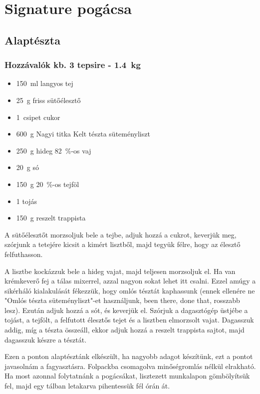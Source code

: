 \newpage
\section{Signature pogácsa} \label{sec:signature-pogacsa}

\subsection*{Alaptészta}
\subsubsection*{Hozzávalók kb. 3 tepsire - \qty{1.4}{\kg}}
\begin{itemize}
    \item \qty{150}{\ml} langyos tej
    \item \qty{25}{\g} friss sütőélesztő
    \item \qty{1}{csipet} cukor
    \item \qty{600}{\g} Nagyi titka Kelt tészta süteményliszt
    \item \qty{250}{\g} hideg \qty{82}{\percent}-os vaj
    \item \qty{20}{\g} só
    \item \qty{150}{g} \qty{20}{\percent}-os tejföl
    \item \num{1} tojás
    \item \qty{150}{\g} reszelt trappista
\end{itemize}

A sütőélesztőt morzsoljuk bele a tejbe, adjuk hozzá a cukrot, keverjük meg, szórjunk a tetejére kicsit a kimért lisztből, majd tegyük félre, hogy az élesztő felfuthasson.

A lisztbe kockázzuk bele a hideg vajat, majd teljesen morzsoljuk el. Ha van krémkeverő fej a tálas mixerrel, azzal nagyon sokat lehet itt csalni. Ezzel amúgy a sikérháló kialakulását fékezzük, hogy omlós tésztát kaphassunk (ennek ellenére ne "Omlós tészta süteményliszt"-et használjunk, been there, done that, rosszabb lesz). Ezután adjuk hozzá a sót, és keverjük el. Szórjuk a dagasztógép üstjébe a tojást, a tejfölt, a felfutott élesztős tejet és a lisztben elmorzsolt vajat. Dagasszuk addig, míg a tészta összeáll, ekkor adjuk hozzá a reszelt trappista sajtot, majd dagasszuk készre a tésztát.

Ezen a ponton alaptésztánk elkészült, ha nagyobb adagot készítünk, ezt a pontot javasolnám a fagyasztásra. Folpackba csomagolva minőségromlás nélkül elrakható. Ha most azonnal folytatnánk a pogácsákat, lisztezett munkalapon gömbölyítsük fel, majd egy tálban letakarva pihentessük fél órán át.

